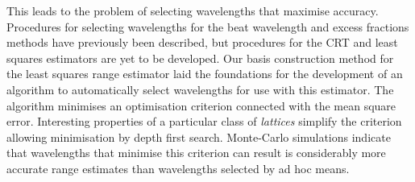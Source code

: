 This leads to the problem of selecting wavelengths that maximise accuracy.  Procedures for selecting wavelengths for the beat wavelength and excess fractions methods have previously been described, but procedures for the CRT and least squares estimators are yet to be developed.  Our basis construction method for the least squares range estimator laid the foundations for the development of an algorithm to automatically select wavelengths for use with this estimator. The algorithm minimises an optimisation criterion connected with the mean square error. Interesting properties of a particular class of \emph{lattices} simplify the criterion allowing minimisation by depth first search.  Monte-Carlo simulations indicate that wavelengths that minimise this criterion can result is considerably more accurate range estimates than wavelengths selected by ad hoc means. 